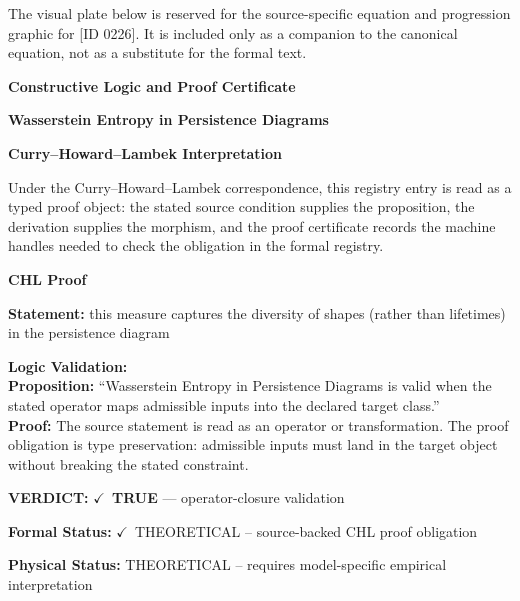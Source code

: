 \begingroup\footnotesize\sloppy
The visual plate below is reserved for the source-specific equation and progression graphic for [ID 0226]. It is included only as a companion to the canonical equation, not as a substitute for the formal text.
\par\endgroup
\ifTZPDarkEdition
{}
\fi

\clearpage
\begingroup\tzpsupportsetup
\noindent\textbf{\fontsize{10.8pt}{12.8pt}\selectfont [ID 0226] Constructive Logic and Proof Certificate}\par
\noindent\textbf{\fontsize{10pt}{12pt}\selectfont Wasserstein Entropy in Persistence Diagrams}\par
\vspace{0.45em}
\begingroup
\footnotesize
\setlength{\parskip}{0.22em}
\setlength{\parindent}{0pt}
\noindent\textbf{Curry--Howard--Lambek Interpretation}\par
Under the Curry--Howard--Lambek correspondence, this registry entry is read as a typed proof
object: the stated source condition supplies the proposition, the derivation supplies the
morphism, and the proof certificate records the machine handles needed to check the obligation
in the formal registry.

\vspace{0.45em}
\noindent\textbf{CHL Proof}\par
\textbf{Statement:} this measure captures the diversity of shapes (rather than lifetimes) in the persistence
diagram

\textbf{Logic Validation:}\\
\textbf{Proposition:} ``Wasserstein Entropy in Persistence Diagrams is valid when the stated operator maps
admissible inputs into the declared target class.''\\
\textbf{Proof:} The source statement is read as an operator or transformation. The proof obligation is
type preservation: admissible inputs must land in the target object without breaking the
stated constraint.

\textbf{VERDICT:} \ensuremath{\checkmark}\ \textbf{TRUE} --- operator-closure validation

\textbf{Formal Status:} \ensuremath{\checkmark}\ THEORETICAL -- source-backed CHL proof obligation

\textbf{Physical Status:} THEORETICAL -- requires model-specific empirical interpretation
\par\vspace{0.45em}
\par
\ifTZPDarkEdition
{}
\fi
\endgroup
\endgroup
